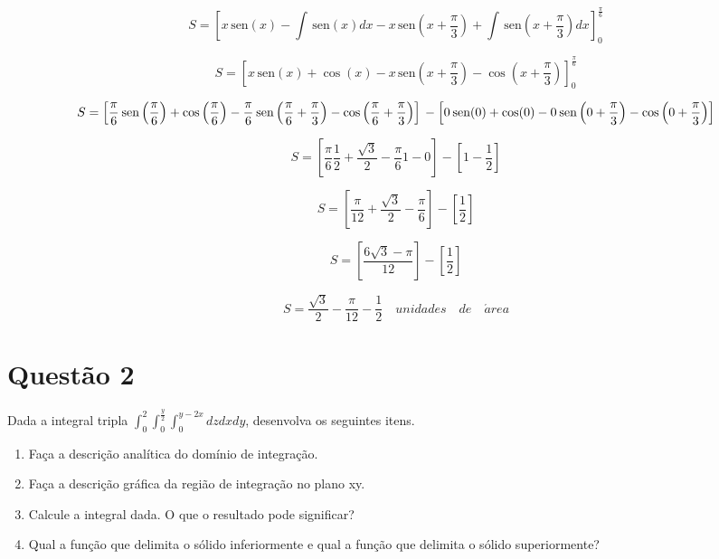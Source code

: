 \documentclass[10pt,a4paper]{article}
\newcommand{\sen}{\hspace{2pt}\textrm{sen}}
\begin{document}
	\begin{equation*}
		S = \left[ x \sen (x) - \int \sen (x) dx - x \sen \left( x + \frac{\pi}{3} \right) + \int \sen \left( x + \frac{\pi}{3} \right) dx \right]_{0}^{\frac{\pi}{6}}
	\end{equation*}
	
	\begin{equation*}
		S = \left[ x \sen (x) +  \cos (x) - x \sen \left( x + \frac{\pi}{3} \right) - \cos \left( x + \frac{\pi}{3} \right) \right]_{0}^{\frac{\pi}{6}}
	\end{equation*}
	
	\begin{equation*}
		S = \left[ \frac{\pi}{6} \sen \left(\frac{\pi}{6}\right) +  \cos \left(\frac{\pi}{6}\right) - \frac{\pi}{6} \sen \left( \frac{\pi}{6} + \frac{\pi}{3} \right) - \cos \left( \frac{\pi}{6} + \frac{\pi}{3} \right) \right] \\- \left[ 0 \sen (0) +  \cos (0) - 0 \sen \left( 0 + \frac{\pi}{3} \right) - \cos \left( 0 + \frac{\pi}{3} \right) \right]
	\end{equation*}
	
	\begin{equation*}
		S = \left[ \frac{\pi}{6} \frac{1}{2} + \frac{\sqrt{3}}{2} - \frac{\pi}{6} 1 - 0 \right] - \left[ 1 - \frac{1}{2} \right]
	\end{equation*}
	
	\begin{equation*}
	S = \left[ \frac{\pi}{12} + \frac{\sqrt{3}}{2} - \frac{\pi}{6} \right] - \left[ \frac{1}{2} \right]
	\end{equation*}
	
	\begin{equation*}
	S = \left[ \frac{6\sqrt{3} - \pi}{12} \right] - \left[ \frac{1}{2} \right]
	\end{equation*}
	
	\begin{equation*}
		S = \frac{\sqrt{3}}{2} - \frac{\pi}{12} - \frac{1}{2} \quad unidades\quad de \quad \acute{a}rea
	\end{equation*}
	
	\section*{Questão 2}
	
	Dada a integral tripla $ \int_{0}^{2} \int_{0}^{\frac{y}{2}} \int_{0}^{y-2x} dz dx dy $, desenvolva os seguintes itens.
	
	\begin{enumerate}[a]
		\item Faça a descrição analítica do domínio de integração.
		\item Faça a descrição gráfica da região de integração no plano xy.
		\item Calcule a integral dada. O que o resultado pode significar?
		\item Qual a função que delimita o sólido inferiormente e qual a função que delimita o sólido superiormente?
	\end{enumerate}
	
\end{document}
